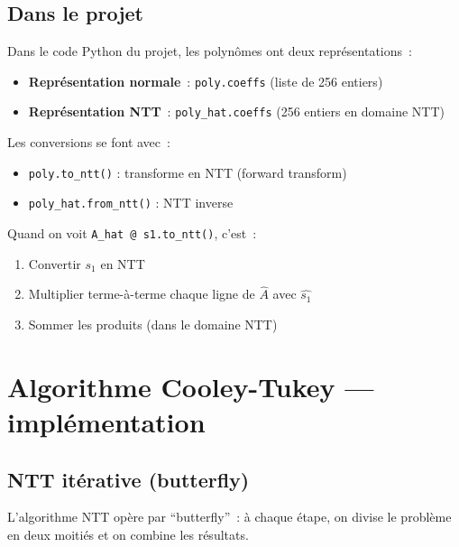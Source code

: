 \documentclass[12pt, a4paper]{article}
\begin{document}
\subsection{Dans le projet}

\begin{importantbox}
Dans le code Python du projet, les polynômes ont deux représentations~:

\begin{itemize}
  \item \textbf{Représentation normale}~: \texttt{poly.coeffs} (liste de 256 entiers)
  \item \textbf{Représentation NTT}~: \texttt{poly\_hat.coeffs} (256 entiers en domaine NTT)
\end{itemize}

Les conversions se font avec~:
\begin{itemize}
  \item \texttt{poly.to\_ntt()} : transforme en NTT (forward transform)
  \item \texttt{poly\_hat.from\_ntt()} : NTT inverse
\end{itemize}

Quand on voit \texttt{A\_hat @ s1.to\_ntt()}, c'est~:
\begin{enumerate}
  \item Convertir $s_1$ en NTT
  \item Multiplier terme-à-terme chaque ligne de $\hat{A}$ avec $\hat{s_1}$
  \item Sommer les produits (dans le domaine NTT)
\end{enumerate}
\end{importantbox}

\section{Algorithme Cooley-Tukey --- implémentation}

\subsection{NTT itérative (butterfly)}

L'algorithme NTT opère par ``butterfly''~: à chaque étape, on divise
le problème en deux moitiés et on combine les résultats.
\end{document}
